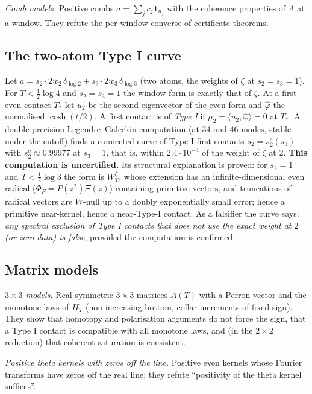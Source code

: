 \documentclass[11pt]{amsart}
\theoremstyle{definition}
\theoremstyle{remark}
\begin{document}
\emph{Comb models.} Positive combs $a=\sum_jc_j\mathbf1_{n_j}$ with the coherence properties of $\Lambda$
at a window. They refute the per-window converse of certificate theorems.

\subsection{The two-atom Type I curve}\label{subsec:typeI}
Let $a=s_2\cdot2w_2\,\delta_{\log2}+s_3\cdot2w_3\,\delta_{\log3}$ (two atoms, the weights of $\zeta$ at
$s_2=s_3=1$). For $T<\frac12\log4$ and $s_2=s_3=1$ the window form is exactly that of $\zeta$. At a first
even contact $T_*$ let $u_2$ be the second eigenvector of the even form and $\hat\varphi$ the normalised
$\cosh(t/2)$. A first contact is of \emph{Type I} if $\mu_2=\langle u_2,\hat\varphi\rangle=0$ at $T_*$.
A double-precision Legendre--Galerkin computation (at $34$ and $46$ modes, stable under the cutoff)
finds a connected curve of Type I first contacts $s_2=s_2^c(s_3)$ with $s_2^c\approx0.99977$ at
$s_3=1$, that is, within $2.4\cdot10^{-4}$ of the weight of $\zeta$ at $2$. \textbf{This computation is
uncertified.} Its structural explanation is proved: for $s_2=1$ and $T<\frac12\log3$ the form is
$W^\zeta_T$, whose extension has an infinite-dimensional even radical ($\Phi_F=P(z^2)\Xi(z)$) containing
primitive vectors, and truncations of radical vectors are $W$-null up to a doubly exponentially small
error; hence a primitive near-kernel, hence a near-Type-I contact. As a falsifier the curve says:
\emph{any spectral exclusion of Type I contacts that does not use the exact weight at $2$ (or zero data)
is false}, provided the computation is confirmed.

\subsection{Matrix models}
\emph{$3\times3$ models.} Real symmetric $3\times3$ matrices $A(T)$ with a Perron vector and the monotone
laws of $H_T$ (non-increasing bottom, collar increments of fixed sign). They show that homotopy and
polarisation arguments do not force the sign, that a Type I contact is compatible with all monotone laws,
and (in the $2\times2$ reduction) that coherent saturation is consistent.

\emph{Positive theta kernels with zeros off the line.} Positive even kernels whose Fourier transforms
have zeros off the real line; they refute ``positivity of the theta kernel suffices''.
\end{document}
